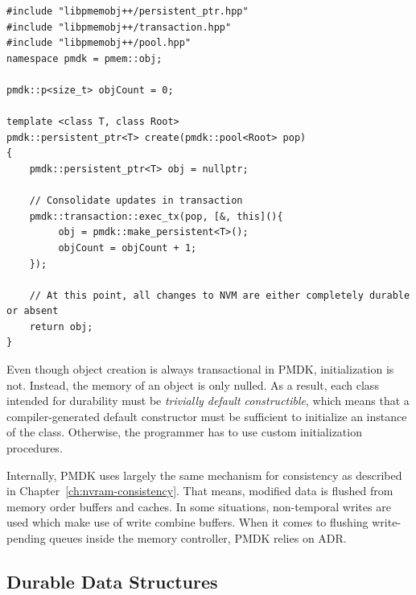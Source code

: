 
\vspace{0.5cm}

\begin{lstlisting}[caption={Consistent updates to NVM using PMDK transactions.},captionpos=b, label=lst:pmdk-tx]
#include "libpmemobj++/persistent_ptr.hpp"
#include "libpmemobj++/transaction.hpp"
#include "libpmemobj++/pool.hpp"
namespace pmdk = pmem::obj;

pmdk::p<size_t> objCount = 0;

template <class T, class Root>
pmdk::persistent_ptr<T> create(pmdk::pool<Root> pop)
{
    pmdk::persistent_ptr<T> obj = nullptr;

    // Consolidate updates in transaction
    pmdk::transaction::exec_tx(pop, [&, this](){
         obj = pmdk::make_persistent<T>();
         objCount = objCount + 1;
    });

    // At this point, all changes to NVM are either completely durable or absent
    return obj;
}
\end{lstlisting}

Even though object creation is always transactional in PMDK, initialization is
not. Instead, the memory of an object is only nulled. As a result, each class
intended for durability must be \emph{trivially default constructible}, which
means that a compiler-generated default constructor must be sufficient to
initialize an instance of the class. Otherwise, the programmer has to use custom
initialization procedures.

Internally, PMDK uses largely the same mechanism for consistency as described in
Chapter~\ref{ch:nvram-consistency}. That means, modified data is flushed from
memory order buffers and caches. In some situations, non-temporal writes are
used which make use of write combine buffers. When it comes to flushing
write-pending queues inside the memory controller, PMDK relies on ADR.



\subsection{Durable Data Structures}
\label{ch:impl-data}

